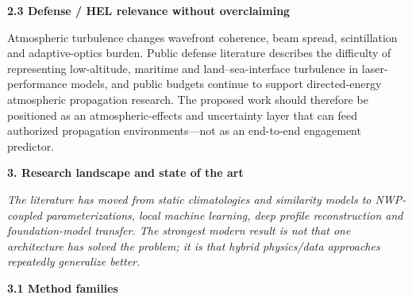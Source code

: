 \documentclass[
]{article}
\begin{document}
\textbf{2.3 Defense / HEL relevance without overclaiming}

Atmospheric turbulence changes wavefront coherence, beam spread,
scintillation and adaptive-optics burden. Public defense literature
describes the difficulty of representing low-altitude, maritime and
land--sea-interface turbulence in laser-performance models, and public
budgets continue to support directed-energy atmospheric propagation
research. The proposed work should therefore be positioned as an
atmospheric-effects and uncertainty layer that can feed authorized
propagation environments---not as an end-to-end engagement predictor.

\textbf{3. Research landscape and state of the art}

\emph{The literature has moved from static climatologies and similarity
models to NWP-coupled parameterizations, local machine learning, deep
profile reconstruction and foundation-model transfer. The strongest
modern result is not that one architecture has solved the problem; it is
that hybrid physics/data approaches repeatedly generalize better.}

\textbf{3.1 Method families}
\end{document}
